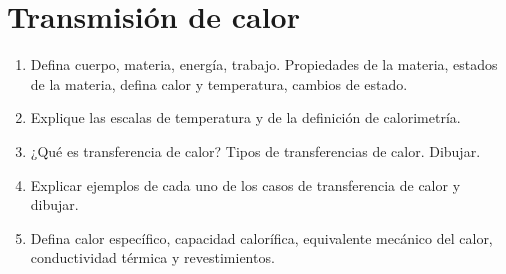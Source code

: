 \documentclass[../main]{subfiles}
\begin{document}
\chapter{Transmisión de calor}


\begin{enumerate}
  \item Defina cuerpo, materia, energía, trabajo. Propiedades de la
    materia, estados de la materia, defina calor y temperatura,
    cambios de estado.
  \item Explique las escalas de temperatura y de la definición de calorimetría.
  \item ¿Qué es transferencia de calor? Tipos de transferencias de
    calor. Dibujar.
  \item Explicar ejemplos de cada uno de los casos de transferencia
    de calor y dibujar.
  \item Defina calor específico, capacidad calorífica, equivalente
    mecánico del calor, conductividad térmica y revestimientos.
\end{enumerate}
\end{document}
